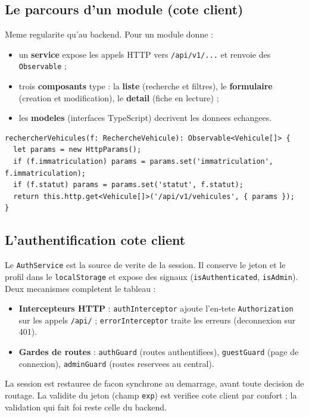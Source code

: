 \documentclass[11pt]{article}
\begin{document}
\subsection{Le parcours d'un module (cote client)}
Meme regularite qu'au backend. Pour un module donne :
\begin{itemize}
  \item un \textbf{service} expose les appels HTTP vers \texttt{/api/v1/...} et renvoie des \texttt{Observable} ;
  \item trois \textbf{composants} type : la \textbf{liste} (recherche et filtres), le \textbf{formulaire}
        (creation et modification), le \textbf{detail} (fiche en lecture) ;
  \item les \textbf{modeles} (interfaces TypeScript) decrivent les donnees echangees.
\end{itemize}
\begin{lstlisting}
rechercherVehicules(f: RechercheVehicule): Observable<Vehicule[]> {
  let params = new HttpParams();
  if (f.immatriculation) params = params.set('immatriculation', f.immatriculation);
  if (f.statut) params = params.set('statut', f.statut);
  return this.http.get<Vehicule[]>('/api/v1/vehicules', { params });
}
\end{lstlisting}

\subsection{L'authentification cote client}
Le \texttt{AuthService} est la source de verite de la session. Il conserve le jeton et le profil dans le
\texttt{localStorage} et expose des signaux (\texttt{isAuthenticated}, \texttt{isAdmin}). Deux mecanismes
completent le tableau :
\begin{itemize}
  \item \textbf{Intercepteurs HTTP} : \texttt{authInterceptor} ajoute l'en-tete \texttt{Authorization} sur
        les appels \texttt{/api/} ; \texttt{errorInterceptor} traite les erreurs (deconnexion sur 401).
  \item \textbf{Gardes de routes} : \texttt{authGuard} (routes authentifiees), \texttt{guestGuard} (page de
        connexion), \texttt{adminGuard} (routes reservees au central).
\end{itemize}
La session est restauree de facon synchrone au demarrage, avant toute decision de routage. La validite
du jeton (champ \texttt{exp}) est verifiee cote client par confort ; la validation qui fait foi reste
celle du backend.
\end{document}
